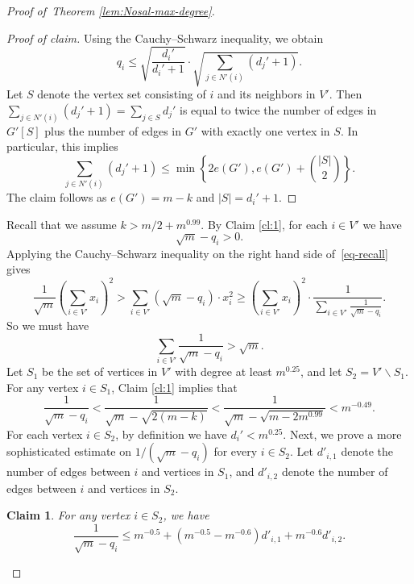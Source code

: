 \documentclass[11pt,a4paper]{article}
\newtheorem{claim}[theorem]{Claim}
\theoremstyle{definition}
\theoremstyle{remark}
\newenvironment{poc}{\begin{proof}[Proof of claim]\renewcommand*{\qedsymbol}{$\blacksquare$}}{\end{proof}}
\newcommand*{\abs}[1]{\lvert#1\rvert}
\begin{document}
\begin{proof}[Proof of~Theorem \ref{lem:Nosal-max-degree}]
\begin{poc}
Using the Cauchy--Schwarz inequality, we obtain 
$$q_i \leq \sqrt{\frac{d_i'}{d_i' + 1}} \cdot \sqrt{\sum_{j \in N'(i)} (d_j' + 1)}.$$
Let $S$ denote the vertex set consisting of $i$ and its neighbors in $V'$. 
Then $\sum_{j \in N'(i)} (d_j' + 1)=\sum_{j\in S}d_j'$ is equal to twice the number of edges in $G'[S]$ plus the number of edges in $G'$ with exactly one vertex in $S$. In particular, this implies
$$\sum_{j \in N'(i)} (d_j' + 1) \leq 
\min\left\{2e(G'), e(G') + 
\binom{\abs{S}}{2}\right\}.$$
The claim follows as $e(G') = m - k$ and $\abs{S} = d_i' + 1$.  
\end{poc}

Recall that we assume $k > m/2 + m^{0.99}$. 
By Claim \ref{cl:1}, for each $i \in V'$ we have
$$\sqrt{m} - q_i > 0. $$ 
Applying the Cauchy--Schwarz inequality on the right hand side of~\eqref{eq-recall} gives 
$$\frac{1}{\sqrt{m}} \left(\sum_{i \in V'} x_i\right)^2>\sum_{i \in V'} (\sqrt{m} - q_i) \cdot x_i^2 \geq \left(\sum_{i \in V'} x_i \right)^2 \cdot \frac{1}{\sum\limits_{i \in V'} \frac{1}{\sqrt{m} - q_i}}.$$
So we must have
\begin{equation} \label{eqge-sqm}
    \sum_{i \in V'} \frac{1}{\sqrt{m} - q_i} > \sqrt{m}.
\end{equation}
Let $S_1$ be the set of vertices in $V'$ with degree at least $m^{0.25}$, and let $S_2 = V' \backslash S_1$.  
For any vertex $i \in S_1$, Claim \ref{cl:1} implies that  
\begin{equation}  \label{eq-S1} 
\frac{1}{\sqrt{m} - q_i} < \frac{1}{\sqrt{m} - \sqrt{2(m - k)}} < \frac{1}{\sqrt{m} - \sqrt{m - 2m^{0.99}}} < m^{-0.49}. 
\end{equation} 
For each vertex $i \in S_2$, by definition 
we have $d_i' < m^{0.25}$. 
Next, we prove a more sophisticated estimate 
on $1/(\sqrt{m} - q_i)$ for every $i\in S_2$. Let $d'_{i,1}$ denote the number of edges between $i$ and vertices in $S_1$, and $d'_{i,2}$ denote the number of edges between $i$ and vertices in $S_2$. 

\begin{claim}\label{cl:2}
    For any vertex $i\in S_2$, we have 
\begin{equation} \label{eq-S2}
\frac{1}{\sqrt{m} - q_i} \leq m^{-0.5} + (m^{-0.5} - m^{-0.6}) d'_{i,1} + m^{-0.6} d'_{i,2}.
\end{equation} 
\end{claim}



\end{proof}
\end{document}
